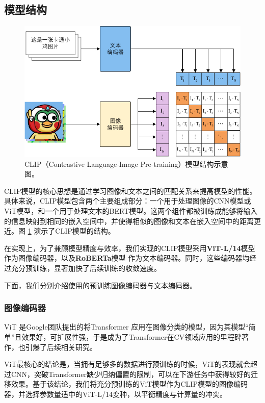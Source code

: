 \documentclass[a4paper]{zreport}
\begin{document}
\subsection{模型结构}

\begin{figure}[h]
\centering
\includegraphics[width=0.95\linewidth]{figures/clip1}
\caption{CLIP（Contrastive Language-Image Pre-training）模型结构示意图。}
\label{fig:clip1}
\end{figure}

CLIP模型的核心思想是通过学习图像和文本之间的匹配关系来提高模型的性能。具体来说，CLIP模型包含两个主要组成部分：一个用于处理图像的CNN模型或ViT模型，和一个用于处理文本的BERT模型。这两个组件都被训练成能够将输入的信息映射到相同的嵌入空间中，并使得相似的图像和文本在嵌入空间中的距离更近。图 \ref{fig:clip1} 演示了CLIP模型的结构。

在实现上，为了兼顾模型精度与效率，我们实现的CLIP模型采用\textbf{ViT-L/14}模型作为图像编码器，以及\textbf{RoBERTa}模型
作为文本编码器。同时，这些编码器均经过充分预训练，显著加快了后续训练的收敛速度。

下面，我们分别介绍使用的预训练图像编码器与文本编码器。

\subsubsection{图像编码器}

ViT \cite{dosovitskiy2020image} 是Google团队提出的将Transformer \cite{vaswani2017attention} 应用在图像分类的模型，因为其模型“简单”且效果好，可扩展性强，于是成为了Transformer在CV领域应用的里程碑著作，也引爆了后续相关研究。

ViT最核心的结论是，当拥有足够多的数据进行预训练的时候，ViT的表现就会超过CNN，突破Transformer缺少归纳偏置的限制，可以在下游任务中获得较好的迁移效果。基于该结论，我们将充分预训练的ViT模型作为CLIP模型的图像编码器，并选择参数量适中的ViT-L/14变种，以平衡精度与计算量的冲突。
\end{document}
